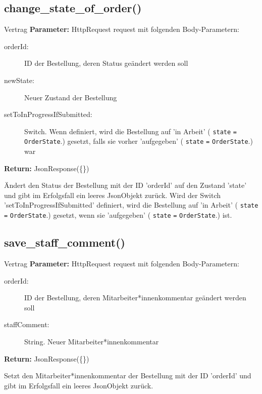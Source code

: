 \documentclass[12pt]{article}
\newcommand{\attribute}[1]{{\color{orange} \texttt{#1}}}
\newcommand{\orderState}[1]{{\color{red}\texttt{OrderState}\color{black}.\color{blue}{#1}}}
\newcommand{\insetContract}{12pt}
\newcommand{\insetMethodDescription}{-0.7cm}
\begin{document}
\subsection{change_state_of_order()}
\begin{contract}{Vertrag}
    \textbf{Parameter:} HttpRequest request mit folgenden Body-Parametern:
    \begin{description}
        \item[\hspace{\insetContract} orderId:] ID der Bestellung, deren Status geändert werden soll
        \item[\hspace{\insetContract} newState:] Neuer Zustand der Bestellung
        \item[\hspace{\insetContract} setToInProgressIfSubmitted:] Switch. Wenn definiert, wird die Bestellung auf 'in Arbeit' (\attribute{state} \texttt{=} \orderState{IN_PROGRESS}) gesetzt, falls sie vorher 'aufgegeben' (\attribute{state} \texttt{=} \orderState{SUBMITTED}) war
    \end{description}
    \textbf{Return:} JsonResponse(\{\})
\end{contract}
\hspace{\insetMethodDescription{}}
Ändert den Status der Bestellung mit der ID 'orderId' auf den Zustand 'state' und gibt im Erfolgsfall ein leeres JsonObjekt zurück.
Wird der Switch 'setToInProgressIfSubmitted' definiert, wird die Bestellung auf 'in Arbeit' (\attribute{state} \texttt{=} \orderState{IN_PROGRESS}) gesetzt, wenn sie 'aufgegeben' (\attribute{state} \texttt{=} \orderState{SUBMITTED}) ist.


\subsection{save_staff_comment()}
\begin{contract}{Vertrag}
    \textbf{Parameter:} HttpRequest request mit folgenden Body-Parametern:
    \begin{description}
        \item[\hspace{\insetContract} orderId:] ID der Bestellung, deren Mitarbeiter*innenkommentar geändert werden soll
        \item[\hspace{\insetContract} staffComment:] String. Neuer Mitarbeiter*innenkommentar
    \end{description}
    \textbf{Return:} JsonResponse(\{\})
\end{contract}
\hspace{\insetMethodDescription{}}
Setzt den Mitarbeiter*innenkommentar der Bestellung mit der ID 'orderId' und gibt im Erfolgsfall ein leeres JsonObjekt zurück.
\end{document}
